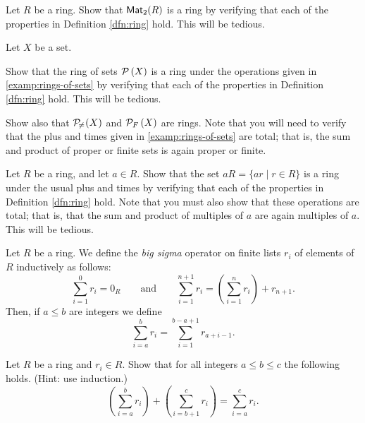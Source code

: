 \begin{exercise}
Let \(R\) be a ring. Show that \(\mathsf{Mat}_{2}(R)\) is a ring by verifying that each of the properties in Definition \ref{dfn:ring} hold. This will be tedious.
\end{exercise}

\begin{exercise}
Let \(X\) be a set.
\begin{proplist}
\item Show that the ring of sets \(\mathcal{P}\left(X\right)\) is a ring under the operations given in \ref{examp:rings-of-sets} by verifying that each of the properties in Definition \ref{dfn:ring} hold. This will be tedious.
\item Show also that \(\mathcal{P}_{\!\neq\!}\left(X\right)\) and \(\mathcal{P}_F\left(X\right)\) are rings. Note that you will need to verify that the plus and times given in \ref{examp:rings-of-sets} are total; that is, the sum and product of proper or finite sets is again proper or finite.
\end{proplist}
\end{exercise}

\begin{exercise}
Let \(R\) be a ring, and let \(a \in R\). Show that the set \(aR = \{ ar \mid r \in R \}\) is a ring under the usual plus and times by verifying that each of the properties in Definition \ref{dfn:ring} hold. Note that you must also show that these operations are total; that is, that the sum and product of multiples of \(a\) are again multiples of \(a\). This will be tedious. \label{exerc:aR-is-ring}
\end{exercise}

\begin{dfn} \label{dfn:big-sigma}
Let \(R\) be a ring. We define the \emph{big sigma} operator on finite lists \(r_i\) of elements of \(R\) inductively as follows: \[ \sum_{i=1}^0 r_i = 0_R \quad\quad \mathrm{and} \quad\quad \sum_{i=1}^{n+1} r_i = \left( \sum_{i=1}^n r_i \right) + r_{n+1}. \] Then, if \(a \leq b\) are integers we define \[ \sum_{i=a}^b r_i = \sum_{i=1}^{b-a+1} r_{a+i-1}. \]
\end{dfn}

\begin{exercise}%
Let \(R\) be a ring and \(r_i \in R\). Show that for all integers \(a \leq b \leq c\) the following holds. (Hint: use induction.) \label{exerc:big-sigma-break} \[ \left( \sum_{i=a}^b r_i \right) + \left( \sum_{i=b+1}^c r_i \right) = \sum_{i=a}^c r_i. \]
\end{exercise}

